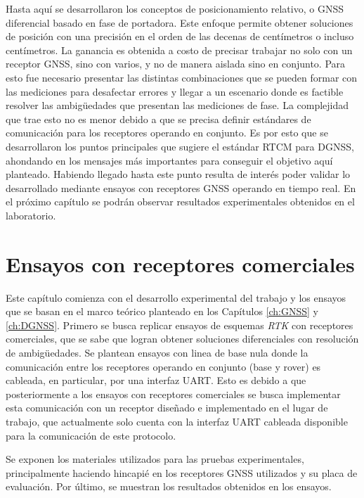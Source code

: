 \documentclass[a4paper,12pt,oneside,onecolumn,final,openright]{book}%
\begin{document}
	Hasta aquí se desarrollaron los conceptos de posicionamiento relativo, o GNSS diferencial basado en fase de portadora. Este enfoque permite obtener soluciones de posición con una precisión en el orden de las decenas de centímetros o incluso centímetros. La ganancia es obtenida a costo de precisar trabajar no solo con un receptor GNSS, sino con varios, y no de manera aislada sino en conjunto. Para esto fue necesario presentar las distintas combinaciones que se pueden formar con las mediciones para desafectar errores y llegar a un escenario donde es factible resolver las ambigüedades que presentan las mediciones de fase. La complejidad que trae esto no es menor debido a que se precisa definir estándares de comunicación para los receptores operando en conjunto. Es por esto que se desarrollaron los puntos principales que sugiere el estándar RTCM para DGNSS, ahondando en los mensajes más importantes para conseguir el objetivo aquí planteado. Habiendo llegado hasta este punto resulta de interés poder validar lo desarrollado mediante ensayos con receptores GNSS operando en tiempo real. En el próximo capítulo se podrán observar resultados experimentales obtenidos en el laboratorio.
\chapter{Ensayos con receptores comerciales}\label{ch:ublox}
	Este capítulo comienza con el desarrollo experimental del trabajo y los ensayos que se basan en el marco teórico planteado en los Capítulos \ref{ch:GNSS} y \ref{ch:DGNSS}. Primero se busca replicar ensayos de esquemas \textit{RTK} con receptores comerciales, que se sabe que logran obtener soluciones diferenciales con resolución de ambigüedades. Se plantean ensayos con linea de base nula donde la comunicación entre los receptores operando en conjunto (base y rover) es cableada, en particular, por una interfaz UART. Esto es debido a que posteriormente a los ensayos con receptores comerciales se busca implementar esta comunicación con un receptor diseñado e implementado en el lugar de trabajo, que actualmente solo cuenta con la interfaz UART cableada disponible para la comunicación de este protocolo. 
	
	Se exponen los materiales utilizados para las pruebas experimentales, principalmente haciendo hincapié en los receptores GNSS utilizados y su placa de evaluación. Por último, se muestran los resultados obtenidos en los ensayos.

\end{document}
